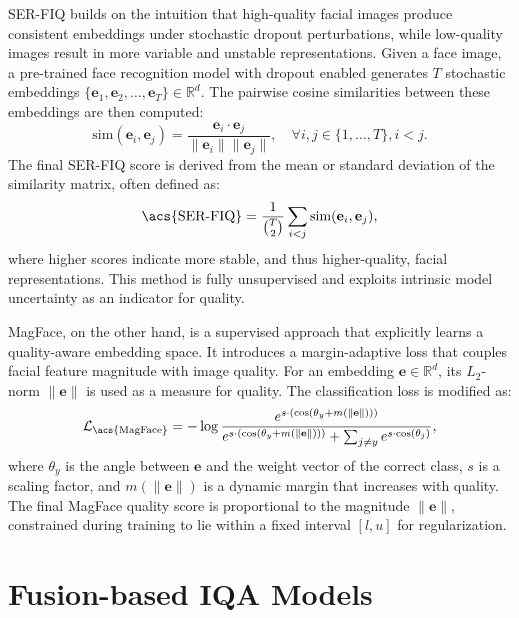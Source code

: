 \acf{SER-FIQ} builds on the intuition that high-quality facial images produce consistent embeddings under stochastic dropout perturbations, while low-quality images result in more variable and unstable representations. Given a face image, a pre-trained face recognition model with dropout enabled generates $T$ stochastic embeddings $\{\mathbf{e}_1, \mathbf{e}_2, \dots, \mathbf{e}_T\} \in \mathbb{R}^d$. The pairwise cosine similarities between these embeddings are then computed:
\begin{equation}
\text{sim}(\mathbf{e}_i, \mathbf{e}_j) = \frac{\mathbf{e}_i \cdot \mathbf{e}_j}{\|\mathbf{e}_i\| \|\mathbf{e}_j\|}, \quad \forall i,j \in \{1,\dots,T\}, i < j.
\end{equation}
The final \acs{SER-FIQ} score is derived from the mean or standard deviation of the similarity matrix, often defined as:
\begin{equation}
\text{\acs{SER-FIQ}} = \frac{1}{\binom{T}{2}} \sum_{i<j} \text{sim}(\mathbf{e}_i, \mathbf{e}_j),
\end{equation}
where higher scores indicate more stable, and thus higher-quality, facial representations. This method is fully unsupervised and exploits intrinsic model uncertainty as an indicator for quality.

\acf{MagFace}, on the other hand, is a supervised approach that explicitly learns a quality-aware embedding space. It introduces a margin-adaptive loss that couples facial feature magnitude with image quality. For an embedding \( \mathbf{e} \in \mathbb{R}^d \), its \( L_2 \)-norm \( \|\mathbf{e}\| \) is used as a measure for quality. The classification loss is modified as:
\begin{equation}
\mathcal{L}_{\text{\acs{MagFace}}} = -\log \frac{e^{s \cdot (\cos(\theta_y + m(\|\mathbf{e}\|)))}}{e^{s \cdot (\cos(\theta_y + m(\|\mathbf{e}\|)))} + \sum_{j \neq y} e^{s \cdot \cos(\theta_j)}},
\end{equation}
where \( \theta_y \) is the angle between \( \mathbf{e} \) and the weight vector of the correct class, \( s \) is a scaling factor, and \( m(\|\mathbf{e}\|) \) is a dynamic margin that increases with quality. The final \acs{MagFace} quality score is proportional to the magnitude \( \|\mathbf{e}\| \), constrained during training to lie within a fixed interval \([l, u]\) for regularization.

\section{Fusion-based IQA Models}\label{sec:fusion_iqa}

